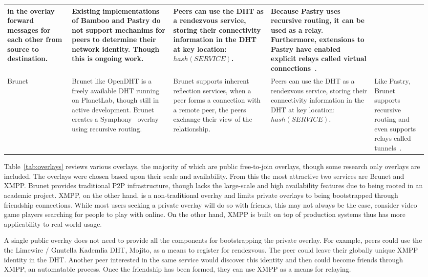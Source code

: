 \documentclass[conference]{IEEEtran}
\begin{document}
\begin{table*}[h!t!]
\begin{tabular}[c]{|m{1.5cm}||m{5.5cm}|m{3cm}|m{3cm}|m{3cm}|}
in the overlay forward messages for each other from source to destination.
&
Existing implementations of Bamboo and Pastry do not support mechanims for
peers to determine their network identity.  Though this is ongoing work.
&
Peers can use the DHT as a rendezvous service, storing their connectivity
information in the DHT at key location:  $hash(SERVICE)$.
&
Because Pastry uses recursive routing, it can be used as a relay.  Furthermore,
extensions to Pastry have enabled explicit relays called virtual
connections~\cite{epost}.
\\ \hline
Brunet~\cite{brunet} &
Brunet like OpenDHT is a freely available DHT running on PlanetLab, though
still in active development.  Brunet creates a Symphony~\cite{symphony} overlay
using recursive routing.
&
Brunet supports inherent reflection services, when a peer forms a connection
with a remote peer, the peers exchange their view of the relationship.
&
Peers can use the DHT as a rendezvous service, storing their connectivity
information in the DHT at key location:  $hash(SERVICE)$.
&
Like Pastry, Brunet supports recursive routing and even supports relays called
tunnels~\cite{hpdc08_0}.
\\ \hline
\end{tabular}
\caption{}
\label{tab:overlays}
\end{table*}

Table~\ref{tab:overlays} reviews various overlays, the majority of which are
public free-to-join overlays, though some research only overlays are included.
The overlays were chosen based upon their scale and availability.  From this
the most attractive two services are Brunet and XMPP.  Brunet provides
traditional P2P infrastructure, though lacks the large-scale and high
availability features due to being rooted in an academic project.  XMPP,
on the other hand, is a non-traditional overlay and limits private overlays
to being bootstrapped through friendship connections.  While most users
seeking a private overlay will do so with friends, this may not always be the
case, consider video game players searching for people to play with online.
On the other hand, XMPP is built on top of production systems thus has
more applicability to real world usage.

A single public overlay does not need to provide all the components for
bootstrapping the private overlay.  For example, peers could use the the
Limewire / Gnutella Kademlia DHT, Mojito, as a means to register for
rendezvous.  The peer could leave their globally unique XMPP identity in the
DHT.  Another peer interested in the same service would discover this identity
and then could become friends through XMPP, an automatable process.  Once the
friendship has been formed, they can use XMPP as a means for relaying.
\end{document}

